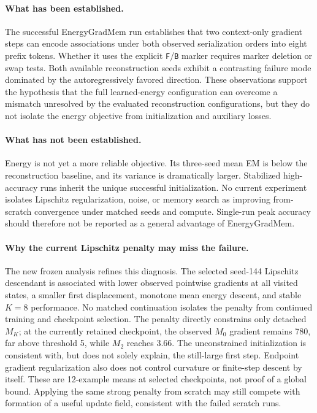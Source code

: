 \documentclass{article}
\newcommand{\egm}{EnergyGradMem}
\begin{document}
\paragraph{What has been established.}
The successful \egm{} run establishes that two context-only gradient steps can encode associations under both observed serialization orders into eight prefix tokens.  Whether it uses the explicit \texttt{F}/\texttt{B} marker requires marker deletion or swap tests.  Both available reconstruction seeds exhibit a contrasting failure mode dominated by the autoregressively favored direction.  These observations support the hypothesis that the full learned-energy configuration can overcome a mismatch unresolved by the evaluated reconstruction configurations, but they do not isolate the energy objective from initialization and auxiliary losses.

\paragraph{What has not been established.}
Energy is not yet a more reliable objective.  Its three-seed mean EM is below the reconstruction baseline, and its variance is dramatically larger.  Stabilized high-accuracy runs inherit the unique successful initialization.  No current experiment isolates Lipschitz regularization, noise, or memory search as improving from-scratch convergence under matched seeds and compute.  Single-run peak accuracy should therefore not be reported as a general advantage of \egm{}.

\paragraph{Why the current Lipschitz penalty may miss the failure.}
The new frozen analysis refines this diagnosis.  The selected seed-144 Lipschitz descendant is associated with lower observed pointwise gradients at all visited states, a smaller first displacement, monotone mean energy descent, and stable $K=8$ performance.  No matched continuation isolates the penalty from continued training and checkpoint selection.  The penalty directly constrains only detached $M_K$; at the currently retained checkpoint, the observed $M_0$ gradient remains 780, far above threshold 5, while $M_2$ reaches 3.66.  The unconstrained initialization is consistent with, but does not solely explain, the still-large first step.  Endpoint gradient regularization also does not control curvature or finite-step descent by itself.  These are 12-example means at selected checkpoints, not proof of a global bound.  Applying the same strong penalty from scratch may still compete with formation of a useful update field, consistent with the failed scratch runs.
\end{document}
